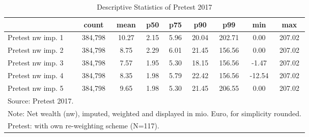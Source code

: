 \begin{table}[htbp]\centering
\def\sym#1{\ifmmode^{#1}\else\(^{#1}\)\fi}
\caption{Descriptive Statistics of Pretest 2017}
\begin{tabular}{l*{1}{cccccccc}}
\hline\hline
                                            &       count&        mean&         p50&         p75&         p90&         p99&         min&         max\\
\hline
Pretest nw imp. 1                           &     384,798&       10.27&        2.15&        5.96&       20.04&      202.71&        0.00&      207.02\\
Pretest nw imp. 2                           &     384,798&        8.75&        2.29&        6.01&       21.45&      156.56&        0.00&      207.02\\
Pretest nw imp. 3                           &     384,798&        7.57&        1.95&        5.30&       18.15&      156.56&       -1.47&      207.02\\
Pretest nw imp. 4                           &     384,798&        8.35&        1.98&        5.79&       22.42&      156.56&      -12.54&      207.02\\
Pretest nw imp. 5                           &     384,798&        9.65&        1.98&        5.30&       21.45&      206.55&        0.00&      207.02\\
\hline\hline
\multicolumn{9}{l}{\footnotesize Source: Pretest 2017.}\\
\multicolumn{9}{l}{\footnotesize Note: Net wealth (nw), imputed, weighted and displayed in mio. Euro, for simplicity rounded.}\\
\multicolumn{9}{l}{\footnotesize Pretest: with own re-weighting scheme (N=117).}\\
\end{tabular}
\end{table}
